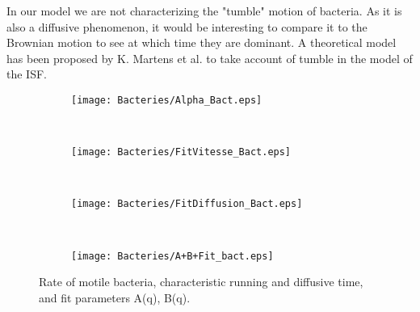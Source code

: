 \documentclass[%
 aip,
 jmp,%
 amsmath,amssymb,
reprint,%
]{revtex4-1}
\begin{document}
In our model we are not characterizing the "tumble" motion of bacteria. As it is also a diffusive phenomenon, it would be interesting to compare it to the Brownian motion to see at which time they are dominant. A theoretical model has been proposed by K. Martens et al. \cite{6_martens2012probability} to take account of tumble in the model of the ISF.

\begin{figure}[H]
	\begin{subfigure}[b]{\linewidth}
		\centering
		\texttt{[image: Bacteries/Alpha\_Bact.eps]}		
	\end{subfigure}
	\vspace{-0.3cm}
	\\
	\begin{subfigure}[b]{\linewidth}
		\centering
		\texttt{[image: Bacteries/FitVitesse\_Bact.eps]}
	\end{subfigure}
	\vspace{-0.2cm}
	\\
	\begin{subfigure}[b]{\linewidth}
		\centering
		\texttt{[image: Bacteries/FitDiffusion\_Bact.eps]}
	\end{subfigure}
	\\
	\hspace{1cm}
	\begin{subfigure}[b]{\linewidth}
		\centering
		\texttt{[image: Bacteries/A+B+Fit\_bact.eps]}
	\end{subfigure}
	\caption{Rate of motile bacteria, characteristic running and diffusive time, and fit parameters A(q), B(q).}
	\label{FitParametersBacteria}
\end{figure}
\end{document}
